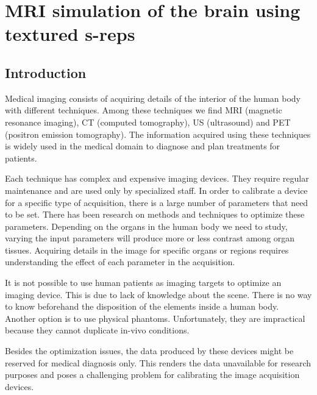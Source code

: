 \graphicspath{{ChapterSimulation/images/}}
\chapter{MRI simulation of the brain using textured s-reps}
\label{chapter:MRISimulation}

\section{Introduction}
\label{sec:introSimulation}

Medical imaging consists of acquiring details of the interior of the human body with different techniques. 
Among these techniques we find MRI (magnetic resonance imaging), CT (computed tomography),
US (ultrasound) and PET (positron emission tomography). 
The information acquired using these techniques is
widely used in the medical domain to diagnose and plan treatments for patients.

Each technique has complex and expensive imaging devices.
They require regular maintenance and are used only by specialized staff. 
In order to calibrate a device for a specific type of acquisition, there is a large number of parameters 
that need to be set.
There has been research on methods and techniques to optimize these parameters. 
Depending on the organs in the human body we need to study,
varying the input parameters will produce more or less contrast among organ tissues. 
Acquiring details in the image for specific organs or regions requires
understanding the effect of each parameter in the acquisition.

It is not possible to use human patients as imaging targets to optimize an imaging device. 
This is due to lack of knowledge about the scene. There is no way to know 
beforehand the disposition of the elements inside a human body.
Another option is to use physical phantoms.
Unfortunately, they are impractical because they cannot duplicate in-vivo conditions.

Besides the optimization issues, the data produced by these devices 
might be reserved for medical diagnosis only. 
This renders the data unavailable for research purposes
and poses a challenging problem for calibrating the image acquisition devices.

